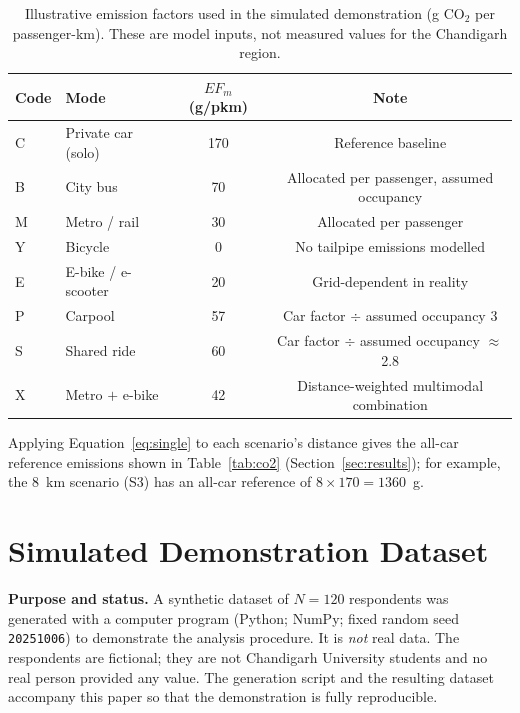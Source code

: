\documentclass[11pt,a4paper]{article}
\newcommand{\code}[1]{\texttt{#1}}
\begin{document}
\begin{table}[H]
\centering
\small
\caption{Illustrative emission factors used in the simulated demonstration (g CO$_2$ per
passenger-km). These are model inputs, not measured values for the Chandigarh region.}
\label{tab:ef}
\begin{tabular}{@{}llcc@{}}
\toprule
\textbf{Code} & \textbf{Mode} & \textbf{$EF_m$ (g/pkm)} & \textbf{Note}\\
\midrule
C & Private car (solo) & 170 & Reference baseline\\
B & City bus & 70 & Allocated per passenger, assumed occupancy\\
M & Metro / rail & 30 & Allocated per passenger\\
Y & Bicycle & 0 & No tailpipe emissions modelled\\
E & E-bike / e-scooter & 20 & Grid-dependent in reality\\
P & Carpool & 57 & Car factor $\div$ assumed occupancy 3\\
S & Shared ride & 60 & Car factor $\div$ assumed occupancy $\approx$ 2.8\\
X & Metro $+$ e-bike & 42 & Distance-weighted multimodal combination\\
\bottomrule
\end{tabular}
\end{table}

Applying Equation~\ref{eq:single} to each scenario's distance gives the all-car reference emissions
shown in Table~\ref{tab:co2} (Section~\ref{sec:results}); for example, the 8~km scenario (S3) has an
all-car reference of $8 \times 170 = 1360$~g.

\section{Simulated Demonstration Dataset}
\label{sec:dataset}

\textbf{Purpose and status.} A synthetic dataset of $N = 120$ respondents was generated with a
computer program (Python; NumPy; fixed random seed \code{20251006}) to demonstrate the analysis
procedure. It is \emph{not} real data. The respondents are fictional; they are not Chandigarh
University students and no real person provided any value. The generation script and the resulting
dataset accompany this paper so that the demonstration is fully reproducible.
\end{document}
